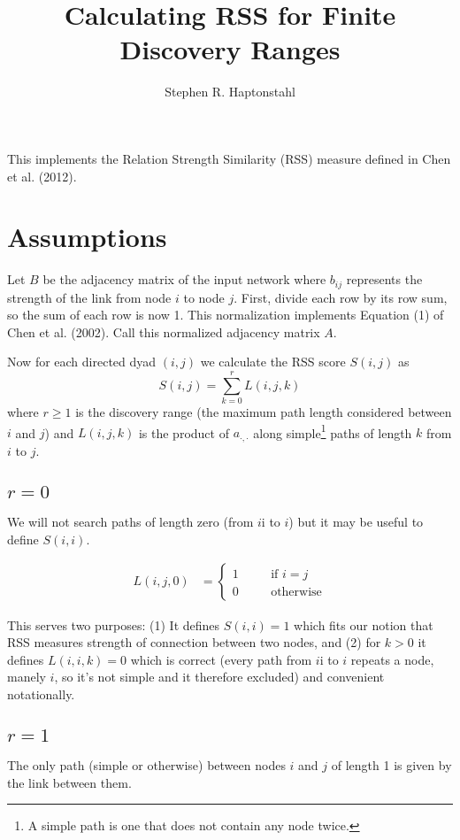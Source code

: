 \documentclass[11pt]{article} %
\title{Calculating RSS for Finite Discovery Ranges}
\author{Stephen R. Haptonstahl}
\begin{document}
\maketitle

This implements the Relation Strength Similarity (RSS) measure defined in Chen et al. (2012).

\section{Assumptions}
Let $B$ be the adjacency matrix of the input network where $b_{ij}$ represents the strength of the link from node $i$ to node $j$.  First, divide each row by its row sum, so the sum of each row is now 1.  This normalization implements Equation (1) of Chen et al. (2002).  Call this normalized adjacency matrix $A$.  

Now for each directed dyad $(i,j)$ we calculate the RSS score $S(i,j)$ as
  $$S(i,j) = \sum_{k=0}^r L(i,j,k)$$
where $r\geq1$ is the discovery range (the maximum path length considered between $i$ and $j$) and $L(i,j,k)$ is the product of $a_{\cdot,\cdot}$ along simple\footnote{A simple path is one that does not contain any node twice.} paths of length $k$ from $i$ to $j$.

\subsection{$r=0$}
We will not search paths of length zero (from $i$i to $i$) but it may be useful to define $S(i,i)$.

\begin{align}
  L(i,j,0) &= \left\{ \begin{array}{lll} 1 & \hspace{1em} & \text{if } i=j \\ 0 & & \text{otherwise} \end{array} \right.
\end{align}

This serves two purposes: (1) It defines $S(i,i)=1$ which fits our notion that RSS measures strength of connection between two nodes, and (2) for $k>0$ it defines $L(i,i,k)=0$ which is correct (every path from $i$i to $i$ repeats a node, manely $i$, so it's not simple and it therefore excluded) and convenient notationally.

\subsection{$r=1$}
The only path (simple or otherwise) between nodes $i$ and $j$ of length 1 is given by the link between them.
\end{document}
